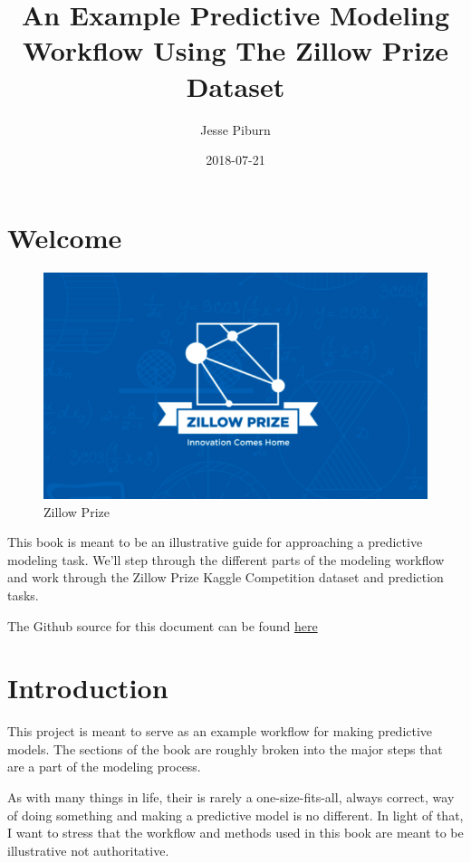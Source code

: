 \documentclass[]{book}
\title{An Example Predictive Modeling Workflow Using The Zillow Prize Dataset}
\author{Jesse Piburn}
\date{2018-07-21}
\theoremstyle{definition}
\theoremstyle{definition}
\theoremstyle{definition}
\theoremstyle{remark}
\begin{document}
\maketitle

{
\setcounter{tocdepth}{1}
\tableofcontents
}
\chapter*{Welcome}\label{welcome}

\begin{figure}
\centering
\includegraphics{zillowprize-png.png}
\caption{Zillow Prize}
\end{figure}

This book is meant to be an illustrative guide for approaching a
predictive modeling task. We'll step through the different parts of the
modeling workflow and work through the Zillow Prize Kaggle Competition
dataset and prediction tasks.

The Github source for this document can be found
\href{https://github.com/jpiburn/zillow-prize}{here}

\chapter{Introduction}\label{intro}

This project is meant to serve as an example workflow for making
predictive models. The sections of the book are roughly broken into the
major steps that are a part of the modeling process.

As with many things in life, their is rarely a one-size-fits-all, always
correct, way of doing something and making a predictive model is no
different. In light of that, I want to stress that the workflow and
methods used in this book are meant to be illustrative not
authoritative.
\end{document}
